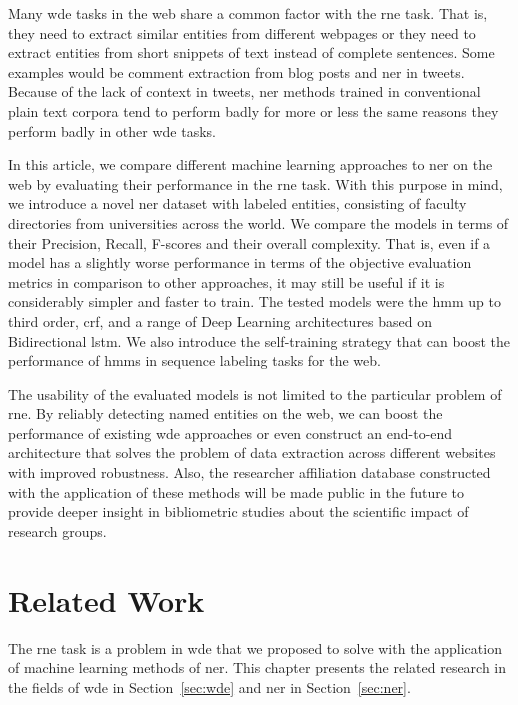 \documentclass{nle}
\begin{document}
Many \gls{wde} tasks in the web share a common
factor with the \gls{rne} task. That is, they need to extract similar
entities from different webpages or they need to extract entities from short snippets of text 
instead of complete sentences. Some examples would be comment extraction from blog
posts and \gls{ner} in tweets. Because of the lack of context in tweets, \gls{ner} methods trained 
in conventional plain text corpora tend to perform badly for more or less the same reasons 
they perform badly in other \gls{wde} tasks.

In this article, we compare different machine learning approaches to 
\gls{ner} on the web by evaluating their performance in the 
\gls{rne} task. With this purpose in mind, we introduce a novel \gls{ner} dataset 
with labeled entities, consisting of faculty directories from universities across the world. 
We compare the models in terms of their Precision, Recall, F-scores and their 
overall complexity. That is, even if a model has a slightly worse performance in terms of the
objective evaluation metrics in comparison to other approaches, it may still be useful if it 
is considerably simpler and faster to train.
The tested models were the \gls{hmm} up to third order, \gls{crf}, and a range of Deep Learning 
architectures based on Bidirectional \gls{lstm}. We also 
introduce the self-training strategy that can boost the performance 
of \gls{hmm}s in sequence labeling tasks for the web. 

The usability of the evaluated models is not limited to the particular problem of \gls{rne}. 
By reliably detecting named entities on the web, we can boost the performance 
of existing \gls{wde} approaches or even construct an end-to-end architecture that
solves the problem of data extraction across different websites with improved robustness. Also, 
the researcher affiliation database constructed with the application of these methods will
be made public in the future to provide deeper insight in bibliometric studies about the
scientific impact of research groups.


\section{Related Work}
\label{cha:related_work}

The \gls{rne} task is a problem in \gls{wde} that
we proposed to solve with the application of machine learning methods of \gls{ner}.
This chapter presents the related research in the fields of \gls{wde} 
in Section~\ref{sec:wde} and \gls{ner} in Section~\ref{sec:ner}.
\end{document}
